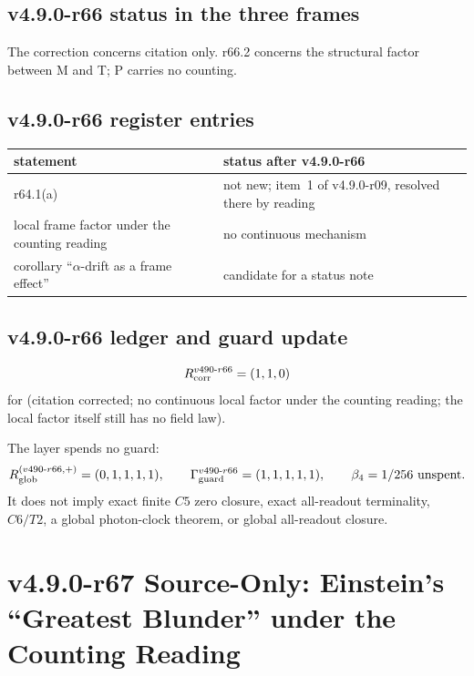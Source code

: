 \subsection*{v4.9.0-r66 status in the three frames}
\label{subsec:v490-r66-frames}

The correction concerns citation only.  r66.2 concerns the structural factor between M and T; P carries no counting.

\subsection*{v4.9.0-r66 register entries}
\label{subsec:v490-r66-register}

\begin{center}
\small
\begin{tabular}{@{}>{\raggedright\arraybackslash}p{}>{\raggedright\arraybackslash}p{}@{}}
\toprule
statement & status after v4.9.0-r66\\
\midrule
r64.1(a) & not new; item~1 of v4.9.0-r09, resolved there by reading\\
local frame factor under the counting reading & no continuous mechanism\\
corollary ``\(\alpha\)-drift as a frame effect'' & candidate for a status note\\
\bottomrule
\end{tabular}
\end{center}

\subsection*{v4.9.0-r66 ledger and guard update}
\label{subsec:v490-r66-ledger-guard}

\[
R_{\rm corr}^{v490\text{-}r66}=(1,1,0)
\]
for (citation corrected; no continuous local factor under the counting reading; the local factor itself still has no field law).

The layer spends no guard:
\[
R_{\rm glob}^{(v490\text{-}r66,+)}=(0,1,1,1,1),
\qquad
\Gamma_{\rm guard}^{v490\text{-}r66}=(1,1,1,1,1),
\qquad
\beta_4=1/256\ \text{unspent}.
\]
It does not imply exact finite \(C5\) zero closure, exact all-readout terminality,
\(C6/T2\), a global photon-clock theorem, or global all-readout closure.

\clearpage
\section*{v4.9.0-r67 Source-Only: Einstein's ``Greatest Blunder'' under the Counting Reading}
\label{sec:v490-r67-einstein-blunder}

